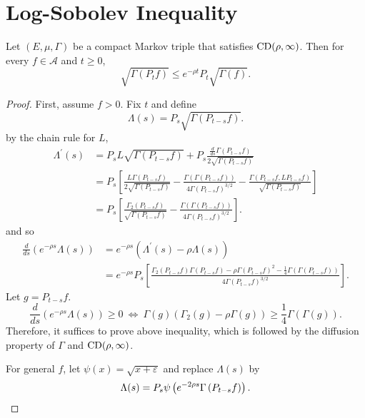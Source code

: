 \section{Log-Sobolev Inequality}

\begin{thm}
    Let $(E,\mu,\Gamma)$ be a compact Markov triple that satisfies $\operatorname{CD}(\rho,\infty)$. Then for every $f \in \mathcal{A}$ and $t \geq 0$,
    \begin{equation*}
        \sqrt{\Gamma(P_tf)} \leq e^{-\rho t}P_t\sqrt{\Gamma(f)}.
    \end{equation*}
\end{thm}
\begin{proof}
    First, assume $f > 0$. Fix $t$ and define
    \begin{equation*}
        \Lambda(s) = P_s\sqrt{\Gamma(P_{t-s}f)}.
    \end{equation*}
    by the chain rule for $L$,
    \begin{align*}
        \Lambda^{\prime}(s) & =P_s L \sqrt{\Gamma\left(P_{t-s} f\right)}+P_s \frac{\frac{d}{d s} \Gamma\left(P_{t-s} f\right)}{2 \sqrt{\Gamma\left(P_{t-s} f\right)}} \\
        & =P_s\left[\frac{L \Gamma\left(P_{t-s} f\right)}{2 \sqrt{\Gamma\left(P_{t-s} f\right)}}-\frac{\Gamma\left(\Gamma\left(P_{t-s} f\right)\right)}{4 \Gamma\left(P_{t-s} f\right)^{3 / 2}}-\frac{\Gamma\left(P_{t-s} f, L P_{t-s} f\right)}{\sqrt{\Gamma\left(P_{t-s} f\right)}}\right] \\
        & =P_s\left[\frac{\Gamma_2\left(P_{t-s} f\right)}{\sqrt{\Gamma\left(P_{t-s} f\right)}}-\frac{\Gamma\left(\Gamma\left(P_{t-s} f\right)\right)}{4 \Gamma\left(P_{t-s} f\right)^{3 / 2}}\right] .
    \end{align*}
    and so
    \begin{align*}
        \frac{d}{d s}\left(e^{-\rho s} \Lambda(s)\right) & =e^{-\rho s}\left(\Lambda^{\prime}(s)-\rho \Lambda(s)\right) \\
        & =e^{-\rho s} P_s\left[\frac{\Gamma_2\left(P_{t-s} f\right) \Gamma\left(P_{t-s} f\right)-\rho \Gamma\left(P_{t-s} f\right)^2-\frac{1}{4} \Gamma\left(\Gamma\left(P_{t-s} f\right)\right)}{4 \Gamma\left(P_{t-s} f\right)^{3 / 2}}\right].
    \end{align*}
    Let $g = P_{t-s}f$.
    \begin{equation*}
        \frac{d}{d s}\left(e^{-\rho s} \Lambda(s)\right) \geq 0 ~\Leftrightarrow~\Gamma(g)\left(\Gamma_2(g)-\rho \Gamma(g)\right) \geq \frac{1}{4} \Gamma(\Gamma(g)).
    \end{equation*}
    Therefore, it suffices to prove above inequality, which is followed by the diffusion property of $\Gamma$ and $\operatorname{CD}(\rho,\infty)$.

    For general $f$, let $\psi(x) = \sqrt{x + \varepsilon}$ and replace $\Lambda(s)$ by
    \begin{equation*}
        \Lambda(s)=P_s \psi\left(e^{-2 \rho s} \Gamma\left(P_{t-s} f\right)\right). \qedhere
    \end{equation*}
\end{proof}


